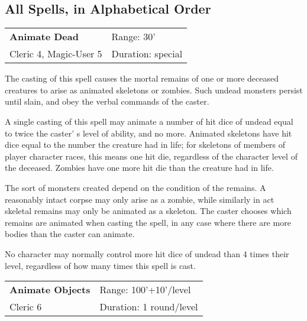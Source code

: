 \documentclass[a4paper,twoside,openany,10pt]{book}
\begin{document}
\pagebreak

\subsection{All Spells, in Alphabetical Order} \label{all-spells-in-alphabetical-order}

\begin{multicols}{2}

\begin{flushleft}
\begin{tabularx}{0.45\textwidth}{@{}m{3.4cm}m{5.5cm}@{}} 
\textbf{Animate Dead} & Range:	30'\\
Cleric 4, Magic-User 5 & Duration: special\\	
\end{tabularx}\end{flushleft}

\label{animate-dead-range-30}


The casting of this spell causes the mortal remains of one or more deceased creatures to arise as animated skeletons or zombies. Such undead monsters persist until slain, and obey the verbal commands of the caster.

A single casting of this spell may animate a number of hit dice of undead equal to twice the caster' s level of ability, and no more. Animated skeletons have hit dice equal to the number the creature had in life; for skeletons of members of player character races, this means one hit die, regardless of the character level of the deceased. Zombies have one more hit die than the creature had in life.

The sort of monsters created depend on the condition of the remains. A reasonably intact corpse may only arise as a zombie, while similarly in act skeletal remains may only be animated as a skeleton. The caster chooses which remains are animated when casting the spell, in any case where there are more bodies than the caster can animate.

No character may normally control more hit dice of undead than 4 times their level, regardless of how many times this spell is cast.

\smallskip\begin{flushleft} 
\begin{tabularx}{0.45\textwidth}{@{}m{3.2cm}m{5.5cm}@{}} 
\textbf{Animate Objects} & Range: 100'+10'/level\\
Cleric 6 & Duration: 1 round/level\\	
\end{tabularx}\end{flushleft}



\end{multicols}
\end{document}
